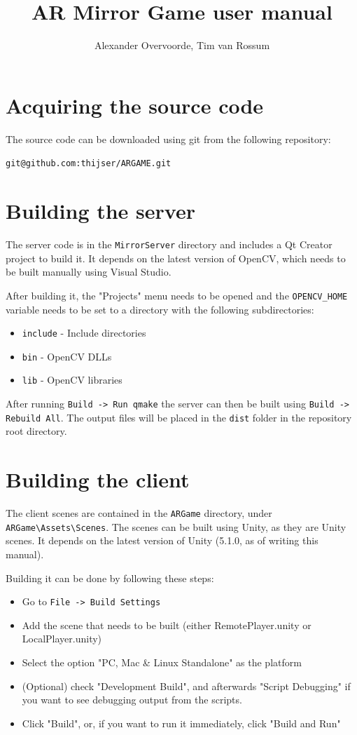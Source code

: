 \documentclass[]{report}
\title{AR Mirror Game user manual}
\author{Alexander Overvoorde, Tim van Rossum}
\begin{document}
\maketitle

\section*{Acquiring the source code}

The source code can be downloaded using git from the following repository:

\verb#git@github.com:thijser/ARGAME.git#

\section*{Building the server}

The server code is in the \verb#MirrorServer# directory and includes a Qt
Creator project to build it. It depends on the latest version of OpenCV, which
needs to be built manually using Visual Studio.

After building it, the "Projects" menu needs to be opened and the
\verb#OPENCV_HOME# variable needs to be set to a directory with the following
subdirectories:

\begin{itemize}
    \item \verb#include# - Include directories
    \item \verb#bin# - OpenCV DLLs
    \item \verb#lib# - OpenCV libraries
\end{itemize}

After running \verb#Build -> Run qmake# the server can then be built using
\verb#Build -> Rebuild All#. The output files will be placed in the \verb#dist#
folder in the repository root directory.

\section*{Building the client}

The client scenes are contained in the \verb#ARGame# directory, under 
\verb#ARGame\Assets\Scenes#. The scenes can be built using Unity, as they are 
Unity scenes. It depends on the latest version of Unity (5.1.0, as of writing 
this manual). 

Building it can be done by following these steps:

\begin{itemize}
	\item Go to \verb#File -> Build Settings#
	\item Add the scene that needs to be built (either RemotePlayer.unity or LocalPlayer.unity)
	\item Select the option "PC, Mac \& Linux Standalone" as the platform
	\item (Optional) check "Development Build", and afterwards "Script Debugging" if you want to see debugging output from the scripts.
	\item Click "Build", or, if you want to run it immediately, click "Build and Run"
\end{itemize}
\end{document}
